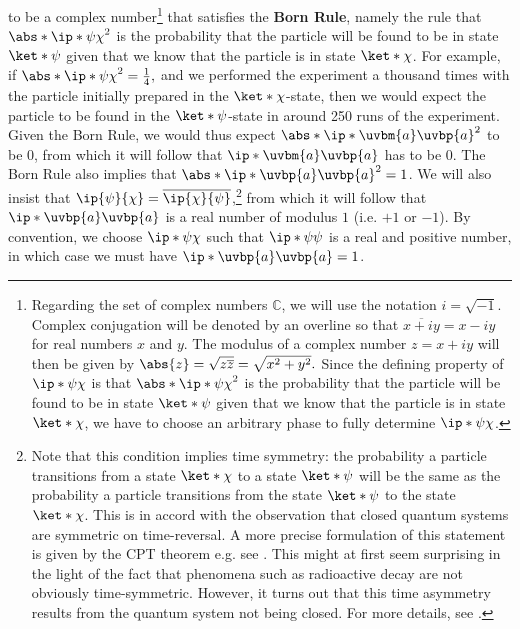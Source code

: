 \documentclass[12pt]{report}
\begin{document}
to be a complex number\footnote{Regarding the set of complex numbers $\mathbb{C}$, %
%
we will use the notation $i=\sqrt{-1}$. %
%
Complex conjugation will be denoted by an overline so that $\overline{x+iy}=x-iy$ %
% 
for real numbers $x$ and $y$. The modulus of a complex number $z=x+iy$ will then be given by $\abs{z}=\sqrt{z\overline{z}}=\sqrt{x^2+y^2}.$ %
%
Since the defining property of  $\ip*{\psi}{\chi}$ is that $\abs*{\ip*{\psi}{\chi}}^2$ is the probability that the particle will be found to be in state $\ket*{\psi}$ given that we know that the particle is in state $\ket*{\chi}$, we have to choose an arbitrary phase to fully determine $\ip*{\psi}{\chi}$. } that satisfies the \textbf{Born Rule},\label{bornrule} namely the rule that $\abs*{\ip*{\psi}{\chi}}^2$ is the probability that the particle will be found to be in state $\ket*{\psi}$ given that we know that the particle is in state $\ket*{\chi}$. For example, if $\abs*{\ip*{\psi}{\chi}}^2=\frac{1}{4},$ and we performed the experiment a thousand times with the particle initially prepared in the $\ket*{\chi}$-state, then we would expect the particle to be found in the $\ket*{\psi}$-state in around 250 runs of the experiment. Given the Born Rule, we  would thus expect $\abs*{\ip*{\uvbm{a}}{\uvbp{a}}}^2$ to be $0$, from which it will follow that $\ip*{\uvbm{a}}{\uvbp{a}}$ has to be $0$. The Born Rule also implies that $\abs*{\ip*{\uvbp{a}}{\uvbp{a}}}^2=1$. We will also insist that $\ip{\psi}{\chi}=\overline{\ip{\chi}{\psi}}$,\footnote{Note that this condition implies time symmetry: the probability a particle transitions from a state $\ket*{\chi}$ to a state $\ket*{\psi}$ will be the same as the probability a particle transitions from the state $\ket*{\psi}$ to the state $\ket*{\chi}$. This is in accord with the observation that closed quantum systems are symmetric on time-reversal. A more precise formulation of this statement is given by the CPT theorem e.g. see \cite[244]{WeinbergSteven1995Tqto}. This might at first seem surprising in the light of the fact that phenomena such as radioactive decay are not obviously time-symmetric. However, it turns out that this time asymmetry results from the quantum system not being closed. For more details, see \cite{Pascazio2013}.}  from which it will follow that $\ip*{\uvbp{a}}{\uvbp{a}}$ is a real number of modulus $1$ (i.e. $+1$ or $-1$). By convention, we choose $\ip*{\psi}{\chi}$  such that $\ip*{\psi}{\psi}$ is a real and positive number, in which case we must have $\ip*{\uvbp{a}}{\uvbp{a}}=1$.
\end{document}
